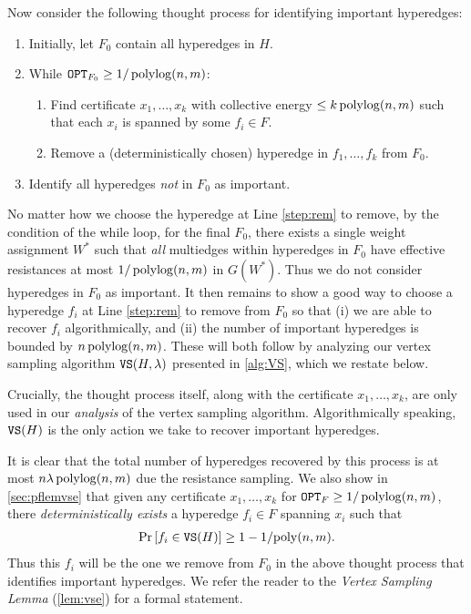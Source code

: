 \documentclass{article}
\begin{document}
Now consider the following thought process for identifying important hyperedges:

\begin{enumerate}
    \item Initially, let $F_0$ contain all hyperedges in $H$.
    \item While $\mathtt{OPT}_{F_0} \geq 1/\operatorname{polylog}(n,m)$:
    \begin{enumerate}
        \item Find certificate $x_1,\ldots,x_k$ with collective energy
        $\leq k \operatorname{polylog}(n,m)$
        such that each $x_i$ is spanned by some $f_i\in F$.
    \item Remove a (deterministically chosen) hyperedge in $f_1,\ldots,f_k$
    from $F_0$. \label{step:rem}
    \end{enumerate}
    \item Identify all hyperedges \textit{not} in $F_0$ as important.
\end{enumerate}

No matter how we choose the hyperedge at Line \ref{step:rem} to remove,
by the condition of the while loop,
for the final $F_0$,
there exists a single weight assignment $W^*$ such that
\textit{all} multiedges within hyperedges in $F_0$ have effective resistances
at most $1/\operatorname{polylog}(n,m)$ in $G(W^*)$.
Thus we do not consider hyperedges in $F_0$ as important.
It then remains to show a good way to choose a hyperedge $f_i$ at Line \ref{step:rem}
to remove from $F_0$
so that (i) we are able to recover $f_i$ algorithmically, and
(ii) the number of important hyperedges is bounded by $n\operatorname{polylog}(n,m)$.
These will both follow by analyzing our vertex sampling algorithm $\mathtt{VS}(H,\lambda)$ presented in \cref{alg:VS}, which we restate below.

\begin{remark}
Crucially,
the thought process itself, along with the certificate
$x_1,\ldots,x_k$, are only used in our \textit{analysis} of the vertex sampling
algorithm. Algorithmically speaking, $\mathtt{VS}(H)$ is the only action we take to
recover important hyperedges.
\end{remark}

\vsov*



It is clear that the total number of hyperedges recovered by this process
is at most $n\lambda \operatorname{polylog}(n,m)$ due the resistance sampling.
We also show in \cref{sec:pflemvse} that
given any certificate $x_1,\ldots,x_k$ for $\mathtt{OPT}_F \geq 1/\operatorname{polylog}(n,m)$,
there \textit{deterministically exists} 
a hyperedge $f_i\in F$ spanning $x_i$ such that
\begin{align}
    \mathrm{Pr}\left[ f_i\in \mathtt{VS}(H) \right] \geq 1 - 1/\mathrm{poly}(n,m).
\end{align}
Thus this $f_i$ will be the one we remove from $F_0$
in the above thought process that identifies important hyperedges.
We refer the reader to the \textit{Vertex Sampling Lemma} (\cref{lem:vse})
for a formal statement.
\end{document}
